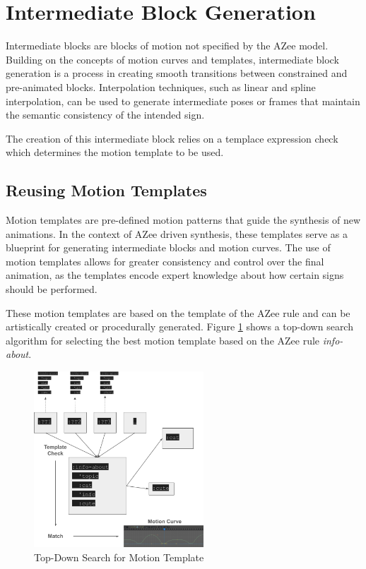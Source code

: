 \documentclass[../../main.tex]{subfiles}
\begin{document}
\section{Intermediate Block Generation}
\label{ch:intermediate_blocks:intermediate_block_generation}

Intermediate blocks are blocks of motion not specified by the AZee model. Building on the concepts of motion curves and templates, intermediate block generation is a process in creating smooth transitions between constrained and pre-animated blocks. Interpolation techniques, such as linear and spline interpolation, can be used to generate intermediate poses or frames that maintain the semantic consistency of the intended sign.

The creation of this intermediate block relies on a templace expression check which determines the motion template to be used. 

\subsection{Reusing Motion Templates}
\label{ch:intermediate_blocks:reusing_motion_templates}

Motion templates are pre-defined motion patterns that guide the synthesis of new animations. In the context of AZee driven synthesis, these templates serve as a blueprint for generating intermediate blocks and motion curves. The use of motion templates allows for greater consistency and control over the final animation, as the templates encode expert knowledge about how certain signs should be performed.

These motion templates are based on the template of the AZee rule and can be artistically created or procedurally generated. Figure \ref{fig:top_down_search_template} shows a top-down search algorithm for selecting the best motion template based on the AZee rule \emph{info-about}.

\begin{figure}
    \centering \includegraphics[width = 2.5in]{chapters/intermediate_blocks/images/top_down_search_template.png}
    \caption{Top-Down Search for Motion Template}
    \label{fig:top_down_search_template}
\end{figure}
\end{document}
